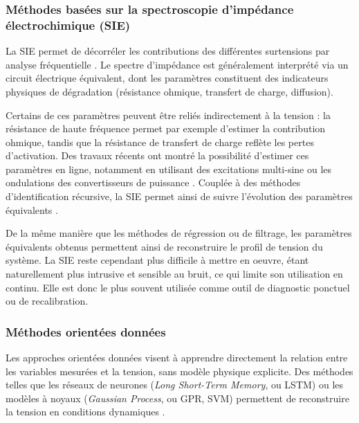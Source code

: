 
\subsubsection{Méthodes basées sur la spectroscopie d'impédance électrochimique (SIE)}

La SIE permet de décorréler les contributions des différentes surtensions par analyse fréquentielle \cite{ma_review_2025}. Le spectre d'impédance est généralement interprété via un circuit électrique équivalent, dont les paramètres constituent des indicateurs physiques de dégradation (résistance ohmique, transfert de charge, diffusion).

Certains de ces paramètres peuvent être reliés indirectement à la tension : la résistance de haute fréquence permet par exemple d'estimer la contribution ohmique, tandis que la résistance de transfert de charge reflète les pertes d'activation. Des travaux récents ont montré la possibilité d'estimer ces paramètres en ligne, notamment en utilisant des excitations multi-sine ou les ondulations des convertisseurs de puissance \cite{xie_impedance_2023}. Couplée à des méthodes d'identification récursive, la SIE permet ainsi de suivre l'évolution des paramètres équivalents \cite{kim_application_2025}.

De la même manière que les méthodes de régression ou de filtrage, les paramètres équivalents obtenus permettent ainsi de reconstruire le profil de tension du système. La SIE reste cependant plus difficile à mettre en oeuvre, étant naturellement plus intrusive et sensible au bruit, ce qui limite son utilisation en continu. Elle est donc le plus souvent utilisée comme outil de diagnostic ponctuel ou de recalibration.


\subsubsection{Méthodes orientées données}

Les approches orientées données visent à apprendre directement la relation entre les variables mesurées et la tension, sans modèle physique explicite. Des méthodes telles que les réseaux de neurones (\textit{Long Short-Term Memory}, ou LSTM) ou les modèles à noyaux (\textit{Gaussian Process}, ou GPR, SVM) permettent de reconstruire la tension en conditions dynamiques \cite{li_health_2024}\cite{zhang_deep_2024}\cite{nagulapati_machine_2023}.

